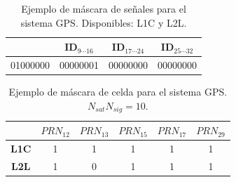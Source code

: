 \documentclass[a4paper,12pt,oneside,onecolumn,final,openright]{book}%
\begin{document}
\begin{table}[]
\centering
\begin{tabular}{|l|l|l|l|}
\hline
\rowcolor[HTML]{9B9B9B} 
\multicolumn{1}{|c|}{\cellcolor[HTML]{9B9B9B}ID$_{1\cdots 8}$}    & \multicolumn{1}{c|}{\cellcolor[HTML]{9B9B9B}ID$_{9\cdots 16}$}    & \multicolumn{1}{c|}{\cellcolor[HTML]{9B9B9B}ID$_{17\cdots 24}$} & \multicolumn{1}{c|}{\cellcolor[HTML]{9B9B9B}ID$_{25\cdots 32}$} \\ \hline
01000000                                                 & 00000001                                                & 00000000                                                & 00000000                                                \\ \hline
\end{tabular}
\caption{Ejemplo de máscara de señales para el sistema GPS. Disponibles: L1C y L2L.}
\label{tab:sig_mask}
\end{table}

\begin{table}[]
\centering
\begin{tabular}{|c|c|c|c|c|c|}
\hline
\rowcolor[HTML]{9B9B9B} 
\multicolumn{1}{|l|}{\cellcolor[HTML]{343434}\textbf{}} & \multicolumn{1}{l|}{\cellcolor[HTML]{9B9B9B}$PRN_{12}$} & \multicolumn{1}{l|}{\cellcolor[HTML]{9B9B9B}$PRN_{13}$} & \multicolumn{1}{l|}{\cellcolor[HTML]{9B9B9B}$PRN_{15}$} & \multicolumn{1}{l|}{\cellcolor[HTML]{9B9B9B}$PRN_{17}$} & \multicolumn{1}{l|}{\cellcolor[HTML]{9B9B9B}$PRN_{29}$} \\ \hline
\cellcolor[HTML]{9B9B9B}\textbf{L1C}                    & 1                                                       & 1                                                       & 1                                                       & 1                                                       & 1                                                       \\ \hline
\cellcolor[HTML]{9B9B9B}\textbf{L2L}                    & 1                                                       & 0                                                       & 1                                                       & 1                                                       & 1                                                       \\ \hline
\end{tabular}
\caption{Ejemplo de máscara de celda para el sistema GPS. $N_{sat}N_{sig} = 10$.}
\label{tab:cell_mask}
\end{table}
\end{document}
